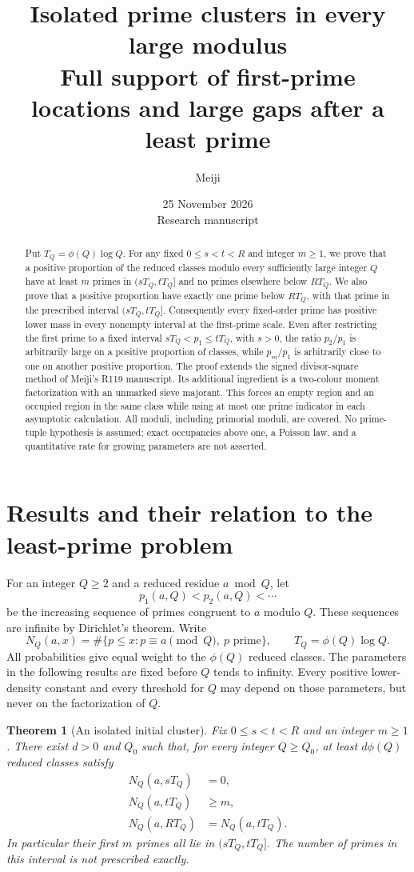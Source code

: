 \documentclass[11pt]{article}
\title{\textbf{Isolated prime clusters in every large modulus}\\[5pt]
 \large Full support of first-prime locations and large gaps after a least prime}
\author{Meiji}
\date{25 November 2026\\[3pt]\small Research manuscript}
\newtheorem{theorem}{Theorem}[section]
\theoremstyle{remark}
\numberwithin{equation}{section}
\begin{document}
\maketitle
\begin{abstract}
Put $T_Q=\phi(Q)\log Q$. For any fixed $0\le s<t<R$ and integer
$m\ge1$, we prove that a positive proportion of the reduced classes
modulo every sufficiently large integer $Q$ have at least $m$ primes
in $(sT_Q,tT_Q]$ and no primes elsewhere below $RT_Q$.
We also prove that a positive proportion have exactly one prime below
$RT_Q$, with that prime in the prescribed interval $(sT_Q,tT_Q]$.
Consequently every fixed-order prime has positive lower mass in every
nonempty interval at the first-prime scale. Even after restricting
the first prime to a fixed interval $sT_Q<p_1\le tT_Q$, with $s>0$,
the ratio $p_2/p_1$ is arbitrarily large on a positive proportion
of classes, while $p_m/p_1$ is arbitrarily close to one on another
positive proportion.
The proof extends the signed divisor-square method of Meiji's R119
manuscript. Its additional ingredient is a two-colour moment
factorization with an unmarked sieve majorant. This forces an empty
region and an occupied region in the same class while using at most
one prime indicator in each asymptotic calculation.
All moduli, including primorial moduli, are covered.
No prime-tuple hypothesis is assumed; exact occupancies above one,
a Poisson law, and a quantitative rate for growing parameters are
not asserted.
\end{abstract}

\section{Results and their relation to the least-prime problem}
\label{sec:results}

For an integer $Q\ge2$ and a reduced residue $a\bmod Q$, let
\[
 p_1(a,Q)<p_2(a,Q)<\cdots
\]
be the increasing sequence of primes congruent to $a$ modulo $Q$.
These sequences are infinite by Dirichlet's theorem. Write
\[
 N_Q(a,x)=\#\{p\le x:p\equiv a\pmod Q,\ p\text{ prime}\},
 \qquad T_Q=\phi(Q)\log Q.
\]
All probabilities give equal weight to the $\phi(Q)$ reduced classes.
The parameters in the following results are fixed before $Q$ tends
to infinity. Every positive lower-density constant and every threshold
for $Q$ may depend on those parameters, but never on the factorization
of $Q$.

\begin{theorem}[An isolated initial cluster]\label{thm:cluster}
Fix $0\le s<t<R$ and an integer $m\ge1$. There exist $d>0$ and $Q_0$ such
that, for every integer $Q\ge Q_0$, at least $d\phi(Q)$ reduced
classes satisfy
\begin{equation}\label{eq:cluster}
 \begin{split}
 N_Q(a,sT_Q)&=0,\\
 N_Q(a,tT_Q)&\ge m,\\
 N_Q(a,RT_Q)&=N_Q(a,tT_Q).
 \end{split}
\end{equation}
In particular their first $m$ primes all lie in $(sT_Q,tT_Q]$.
The number of primes in this interval is not prescribed exactly.
\end{theorem}
\end{document}
